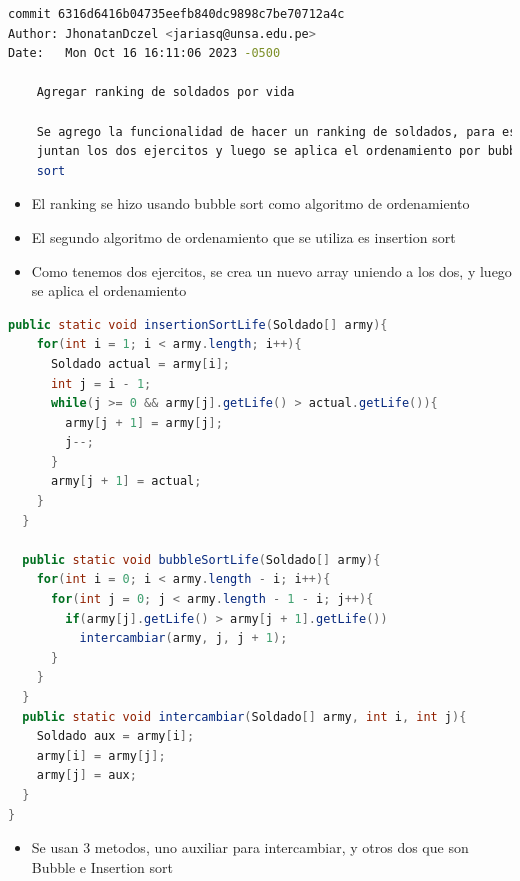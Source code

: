 \begin{lstlisting}[language=bash, caption={Commit principal}]
commit 6316d6416b04735eefb840dc9898c7be70712a4c
Author: JhonatanDczel <jariasq@unsa.edu.pe>
Date:   Mon Oct 16 16:11:06 2023 -0500

    Agregar ranking de soldados por vida

    Se agrego la funcionalidad de hacer un ranking de soldados, para eso, se
    juntan los dos ejercitos y luego se aplica el ordenamiento por bubble
    sort
\end{lstlisting}
\begin{itemize}
    \item El ranking se hizo usando bubble sort como algoritmo de ordenamiento
    \item El segundo algoritmo de ordenamiento que se utiliza es insertion sort
    \item Como tenemos dos ejercitos, se crea un nuevo array uniendo a los dos, y luego se aplica el ordenamiento
\end{itemize}
\begin{lstlisting}[language=java, caption={VideoJuego.java}]
  public static void insertionSortLife(Soldado[] army){
    for(int i = 1; i < army.length; i++){
      Soldado actual = army[i];
      int j = i - 1;
      while(j >= 0 && army[j].getLife() > actual.getLife()){
        army[j + 1] = army[j];
        j--;
      }
      army[j + 1] = actual;
    }
  }

  public static void bubbleSortLife(Soldado[] army){
    for(int i = 0; i < army.length - i; i++){
      for(int j = 0; j < army.length - 1 - i; j++){
        if(army[j].getLife() > army[j + 1].getLife())
          intercambiar(army, j, j + 1);
      }
    }
  }
  public static void intercambiar(Soldado[] army, int i, int j){
    Soldado aux = army[i];
    army[i] = army[j];
    army[j] = aux;
  }
}
\end{lstlisting}
\begin{itemize}
    \item Se usan 3 metodos, uno auxiliar para intercambiar, y otros dos que son Bubble e Insertion sort
\end{itemize}
